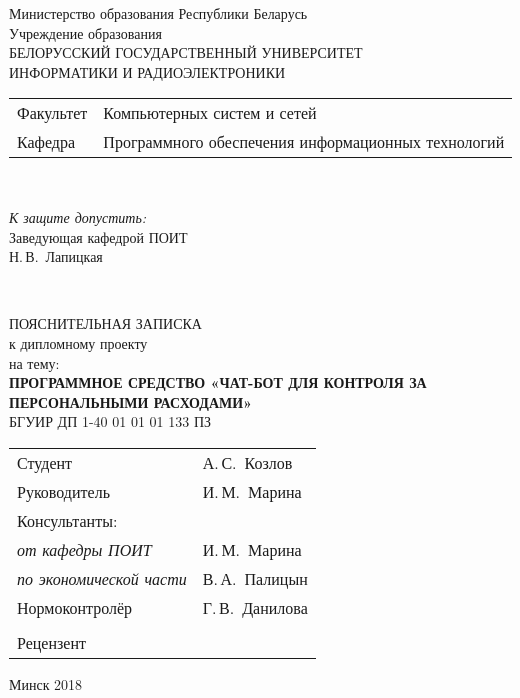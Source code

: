 \begin{titlepage}
  \begin{center}
    Министерство образования Республики Беларусь\\[1em]
    Учреждение образования\\
    БЕЛОРУССКИЙ ГОСУДАРСТВЕННЫЙ УНИВЕРСИТЕТ \\
    ИНФОРМАТИКИ И РАДИОЭЛЕКТРОНИКИ\\[1em]

    \begin{minipage}{\textwidth}
      \begin{flushleft}
        \begin{tabular}{ l l }
          Факультет & Компьютерных систем и сетей\\
          Кафедра   & Программного обеспечения информационных технологий
        \end{tabular}
      \end{flushleft}
    \end{minipage}\\[3em]

    \begin{flushright}
      \begin{minipage}{0.4\textwidth}
        \textit{К защите допустить:}\\[0.8em]
        Заведующая кафедрой ПОИТ\\[0.45em]
        \underline{\hspace*{2.8cm}} Н.\,В.~Лапицкая
      \end{minipage}\\[2.2em]
    \end{flushright}

    {ПОЯСНИТЕЛЬНАЯ ЗАПИСКА}\\
    {к дипломному проекту}\\
    {на тему:}\\[1em]
    \textbf{\large\MakeUppercase{Программное средство «Чат-бот для контроля за персональными расходами»}}\\[1em]


    {БГУИР ДП 1-40 01 01 01 133 ПЗ}\\[2em]
    
    \begin{tabular}{ p{}p{} }
      Студент & А.\,С.~Козлов \\
      Руководитель & И.\,М.~Марина \\
      Консультанты: &\\
      \hspace*{3ex}\emph{от кафедры ПОИТ} & И.\,М.~Марина \\
      \hspace*{3ex}\emph{по экономической части} & В.\,А.~Палицын \\
      Нормоконтролёр & Г.\,В.~Данилова\\
      & \\
      Рецензент &
    \end{tabular}
    
    \vfill
    {\normalsize Минск 2018}
  \end{center}
\end{titlepage}
